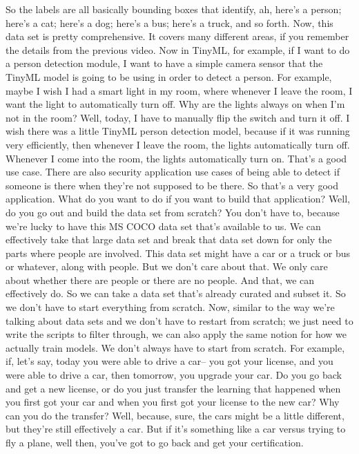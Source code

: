 So the labels are all basically bounding boxes that identify, ah, here's
a person; here's a cat; here's a dog; here's a bus; here's a truck,
and so forth.
Now, this data set is pretty comprehensive.
It covers many different areas, if you remember the details
from the previous video.
Now in TinyML, for example, if I want to do a person detection module,
I want to have a simple camera sensor that the TinyML
model is going to be using in order to detect a person.
For example, maybe I wish I had a smart light in my room,
where whenever I leave the room, I want the light to automatically turn off.
Why are the lights always on when I'm not in the room?
Well, today, I have to manually flip the switch and turn it off.
I wish there was a little TinyML person detection
model, because if it was running very efficiently, then
whenever I leave the room, the lights automatically turn off.
Whenever I come into the room, the lights automatically turn on.
That's a good use case.
There are also security application use cases
of being able to detect if someone is there
when they're not supposed to be there.
So that's a very good application.
What do you want to do if you want to build that application?
Well, do you go out and build the data set from scratch?
You don't have to, because we're lucky to have this MS COCO data
set that's available to us.
We can effectively take that large data set
and break that data set down for only the parts where people are involved.
This data set might have a car or a truck
or bus or whatever, along with people.
But we don't care about that.
We only care about whether there are people or there are no people.
And that, we can effectively do.
So we can take a data set that's already curated and subset it.
So we don't have to start everything from scratch.
Now, similar to the way we're talking about data sets
and we don't have to restart from scratch;
we just need to write the scripts to filter through,
we can also apply the same notion for how we actually train models.
We don't always have to start from scratch.
For example, if, let's say, today you were able to drive a car--
you got your license, and you were able to drive a car, then tomorrow, you
upgrade your car.
Do you go back and get a new license, or do you just
transfer the learning that happened when you first got your car
and when you first got your license to the new car?
Why can you do the transfer?
Well, because, sure, the cars might be a little different,
but they're still effectively a car.
But if it's something like a car versus trying to fly a plane,
well then, you've got to go back and get your certification.
